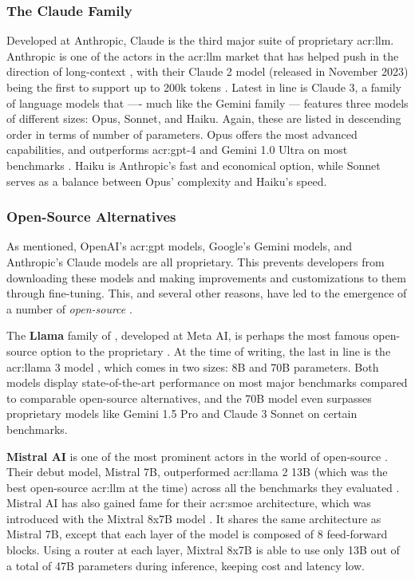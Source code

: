 \subsubsection{The Claude Family}
\label{subsubsec:claude}

Developed at Anthropic, Claude is the third major suite of proprietary \acrshort{acr:llm}. Anthropic is one of the actors in the \acrshort{acr:llm} market that has helped push in the direction of long-context , with their Claude 2 model (released in November 2023) being the first to support up to 200k tokens \citep[9]{anthropicModelCardEvaluations2023}. Latest in line is Claude 3, a family of language models that ---- much like the Gemini family --- features three models of different sizes: Opus, Sonnet, and Haiku. Again, these are listed in descending order in terms of number of parameters. Opus offers the most advanced capabilities, and outperforms \acrshort{acr:gpt}-4 and Gemini 1.0 Ultra on most benchmarks \citep[6]{anthropicClaudeModelFamily2024}. Haiku is Anthropic's fast and economical option, while Sonnet serves as a balance between Opus' complexity and Haiku's speed.

\subsubsection{Open-Source Alternatives}
\label{subsubsec:open-source-llms}

As mentioned, OpenAI's \acrshort{acr:gpt} models, Google's Gemini models, and Anthropic's Claude models are all proprietary. This prevents developers from downloading these models and making improvements and customizations to them through fine-tuning. This, and several other reasons, have led to the emergence of a number of \textit{open-source} .

The \textbf{Llama} family of , developed at Meta AI, is perhaps the most famous open-source option to the proprietary . At the time of writing, the last in line is the \acrshort{acr:llama} 3 model \citep{metaaiIntroducingMetaLlama2024}, which comes in two sizes: 8B and 70B parameters. Both models display state-of-the-art performance on most major benchmarks compared to comparable open-source alternatives, and the 70B model even surpasses proprietary models like Gemini 1.5 Pro and Claude 3 Sonnet on certain benchmarks.

\textbf{Mistral AI} is one of the most prominent actors in the world of open-source . Their debut model, Mistral 7B, outperformed \acrshort{acr:llama} 2 13B (which was the best open-source \acrshort{acr:llm} at the time) across all the benchmarks they evaluated \citep{jiangMistral7B2023}. Mistral AI has also gained fame for their \gls{acr:smoe} architecture, which was introduced with the Mixtral 8x7B model \citep{jiangMixtralExperts2024}. It shares the same architecture as Mistral 7B, except that each layer of the model is composed of 8 feed-forward blocks. Using a router at each layer, Mixtral 8x7B is able to use only 13B out of a total of 47B parameters during inference, keeping cost and latency low.

